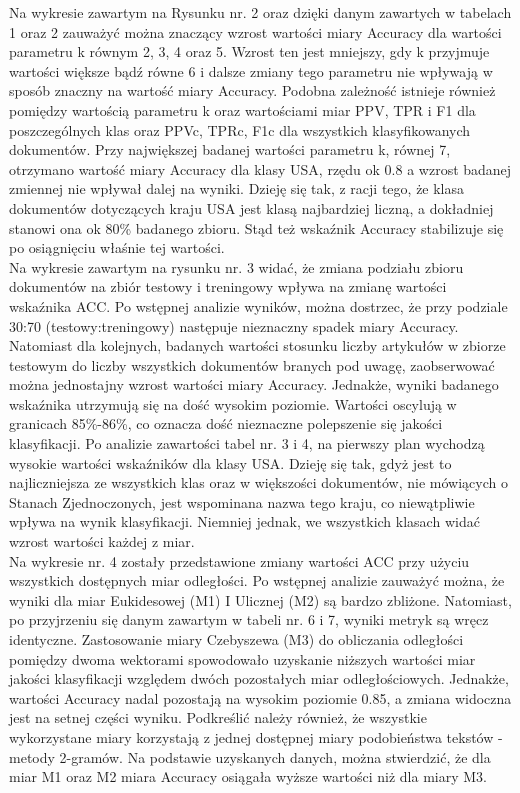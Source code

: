 \documentclass{classrep}
\begin{document}
Na wykresie zawartym na Rysunku nr. 2 oraz dzięki danym zawartych w tabelach 1 oraz 2 zauważyć można znaczący wzrost wartości miary Accuracy dla wartości parametru k równym 2, 3, 4 oraz 5. Wzrost ten jest mniejszy, gdy k przyjmuje wartości większe bądź równe 6 i dalsze zmiany tego parametru nie wpływają w sposób znaczny na wartość miary Accuracy. Podobna zależność istnieje również pomiędzy wartością parametru k oraz wartościami miar PPV, TPR i F1 dla poszczególnych klas oraz PPVc, TPRc, F1c dla wszystkich klasyfikowanych dokumentów. Przy największej badanej wartości parametru k, równej 7, otrzymano wartość miary Accuracy dla klasy USA, rzędu ok 0.8 a wzrost badanej zmiennej nie wpływał dalej na wyniki. Dzieję się tak, z racji tego, że klasa dokumentów dotyczących kraju USA jest klasą najbardziej liczną, a dokładniej stanowi ona ok 80\% badanego zbioru. Stąd też wskaźnik Accuracy stabilizuje się po osiągnięciu właśnie tej wartości.
\\
Na wykresie zawartym na rysunku nr. 3 widać, że zmiana podziału zbioru dokumentów na zbiór testowy i treningowy wpływa na zmianę wartości wskaźnika ACC. Po wstępnej analizie wyników, można dostrzec, że przy podziale 30:70 (testowy:treningowy) następuje nieznaczny spadek miary Accuracy. Natomiast dla kolejnych, badanych wartości stosunku liczby artykułów w zbiorze testowym do liczby wszystkich dokumentów branych pod uwagę, zaobserwować można jednostajny wzrost wartości miary Accuracy. Jednakże, wyniki badanego wskaźnika utrzymują się na dość wysokim poziomie. Wartości oscylują w granicach 85\%-86\%, co oznacza dość nieznaczne polepszenie się jakości klasyfikacji. Po analizie zawartości tabel nr. 3 i 4, na pierwszy plan wychodzą wysokie wartości wskaźników dla klasy USA. Dzieję się tak, gdyż jest to najliczniejsza ze wszystkich klas oraz w większości dokumentów, nie mówiących o Stanach Zjednoczonych, jest wspominana nazwa tego kraju, co niewątpliwie wpływa na wynik klasyfikacji. Niemniej jednak, we wszystkich klasach widać wzrost wartości każdej z miar.
\\
Na wykresie nr. 4 zostały przedstawione zmiany wartości ACC przy użyciu wszystkich dostępnych miar odległości. Po wstępnej analizie zauważyć można, że wyniki dla miar Eukidesowej (M1) I Ulicznej (M2) są bardzo zbliżone. Natomiast, po przyjrzeniu się danym zawartym w tabeli nr. 6 i 7, wyniki metryk są wręcz identyczne. Zastosowanie miary Czebyszewa (M3) do obliczania odległości pomiędzy dwoma wektorami spowodowało uzyskanie niższych wartości miar jakości klasyfikacji względem dwóch pozostałych miar odległościowych. Jednakże, wartości Accuracy nadal pozostają na wysokim poziomie 0.85, a zmiana widoczna jest na setnej części wyniku. Podkreślić należy również, że wszystkie wykorzystane miary korzystają z jednej dostępnej miary podobieństwa tekstów - metody 2-gramów.  Na podstawie uzyskanych danych, można stwierdzić, że dla miar M1 oraz M2 miara Accuracy osiągała wyższe wartości niż dla miary M3.  
\end{document}
